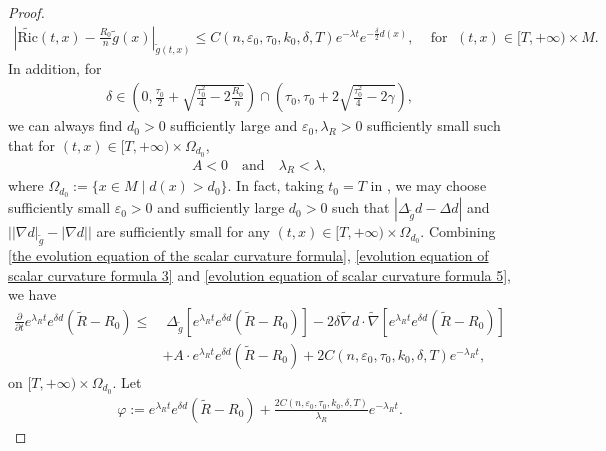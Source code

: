 \documentclass[12pt]{amsart}
\begin{document}
\begin{proof}
\begin{equation}
    \begin{split}
        |\tilde{\mathrm{Ric}}(t, x) - \frac{R_0}{n}\tilde{g}(x)|_{\tilde{g}(t, x)} \leq C(n,\varepsilon_0,\tau_0, k_0, \delta, T) e^{-\lambda t} e^{- \frac{\delta}{2} d(x)},\;\;\; \text{ for }\; (t, x)\in [T, +\infty) \times M.
    \end{split}
\end{equation}
In addition, for
\begin{align*}
    \delta \in \left(0, \frac{\tau_0}{2} + \sqrt{\frac{\tau_0^2}{4} - 2\frac{R_0}{n}} \right) \cap \left(\tau_0, \tau_0 + 2\sqrt{\frac{\tau_0^2}{4} - 2\gamma}\right), 
\end{align*}
we can always find $d_0 > 0$ sufficiently large and $\varepsilon_0, \lambda_R > 0$ sufficiently small such that for $(t, x)\in [T, +\infty)\times \Omega_{d_0}$,
\begin{align}\label{evolution equation of scalar curvature formula 5}
    A < 0 \quad \text{and} \quad \lambda_R < \lambda,
\end{align}
where $\Omega_{d_0}:= \{ x\in M \; | \; d(x) > d_0\}$. In fact, taking $t_0 = T$ in , we may choose sufficiently small $\varepsilon_0 > 0$ and sufficiently large $d_0 > 0$ such that $|\Delta_{\tilde{g}}d - \Delta d|$ and $\big||\nabla d|_{\tilde{g}} - |\nabla d|\big|$ are sufficiently small for any $(t,x)\in[T, +\infty) \times \Omega_{d_0}$. Combining \eqref{the evolution equation of the scalar curvature formula}, \eqref{evolution equation of scalar curvature formula 3} and \eqref{evolution equation of scalar curvature formula 5}, we have  
\begin{equation}
    \begin{split}
        \frac{\partial}{\partial t} e^{\lambda_R t}e^{\delta d} (\tilde{R} - R_0) \leq&\; \Delta_{\tilde{g}} \left[ e^{\lambda_R t}e^{\delta d}(\tilde{R} - R_0) \right]- 2\delta \tilde{\nabla} d\cdot \tilde{\nabla} \left[ e^{\lambda_R t}e^{\delta d} (\tilde{R} - R_0) \right]\\ 
        &+ A\cdot e^{\lambda_R t}e^{\delta d}(\tilde{R} - R_0) + 2C(n, \varepsilon_0, \tau_0, k_0, \delta, T)e^{-\lambda_Rt}, 
    \end{split}
\end{equation}
on $[T, +\infty)\times \Omega_{d_0}$. Let 
\begin{equation}
    \begin{split}
        \varphi := e^{\lambda_R t} e^{\delta d}(\tilde{R} - R_0) + \frac{2C(n,\varepsilon_0,\tau_0, k_0, \delta, T)}{\lambda_R} e^{-\lambda_R t}.

\end{split}
\end{equation}
\end{proof}
\end{document}
